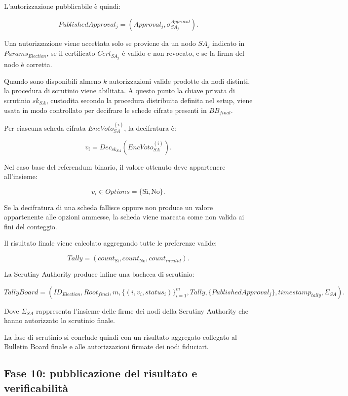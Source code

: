 \documentclass[a4paper,12pt]{article}
\begin{document}
L'autorizzazione pubblicabile \`e quindi:

\[
	PublishedApproval_j =
	(Approval_j, \sigma_{SA_j}^{Approval}).
\]

Una autorizzazione viene accettata solo se proviene da un nodo \(SA_j\) indicato in \(Params_{Election}\), se il certificato \(Cert_{SA_j}\) \`e valido e non revocato, e se la firma del nodo \`e corretta.

Quando sono disponibili almeno \(k\) autorizzazioni valide prodotte da nodi distinti, la procedura di scrutinio viene abilitata.
A questo punto la chiave privata di scrutinio \(sk_{SA}\), custodita secondo la procedura distribuita definita nel setup, viene usata in modo controllato per decifrare le schede cifrate presenti in \(BB_{final}\).

Per ciascuna scheda cifrata \(EncVoto_{SA}^{(i)}\), la decifratura \`e:

\[
	v_i =
	Dec_{sk_{SA}}(EncVoto_{SA}^{(i)}).
\]

Nel caso base del referendum binario, il valore ottenuto deve appartenere all'insieme:

\[
	v_i \in Options = \{\text{S\`i}, \text{No}\}.
\]

Se la decifratura di una scheda fallisce oppure non produce un valore appartenente alle opzioni ammesse, la scheda viene marcata come non valida ai fini del conteggio.

Il risultato finale viene calcolato aggregando tutte le preferenze valide:

\[
	Tally =
	(count_{\text{S\`i}}, count_{\text{No}}, count_{invalid}).
\]

La Scrutiny Authority produce infine una bacheca di scrutinio:

\[
	TallyBoard =
    (ID_{Election}, Root_{final}, m, \{(i, v_i, status_i)\}_{i=1}^{m}, Tally, \{PublishedApproval_j\}, timestamp_{tally}, \Sigma_{SA}).
\]

Dove \(\Sigma_{SA}\) rappresenta l'insieme delle firme dei nodi della Scrutiny Authority che hanno autorizzato lo scrutinio finale.

La fase di scrutinio si conclude quindi con un risultato aggregato collegato al Bulletin Board finale e alle autorizzazioni firmate dei nodi fiduciari.

\subsection{Fase 10: pubblicazione del risultato e verificabilit\`a}
\end{document}
